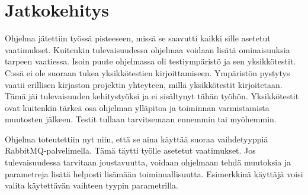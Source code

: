 \section{Jatkokehitys}
Ohjelma jätettiin työssä pisteeseen, missä se saavutti kaikki sille asetetut vaatimukset. Kuitenkin tulevaisuudessa ohjelmaa voidaan lisätä ominaisuuksia tarpeen vaatiessa. Isoin puute ohjelmassa oli testiympäristö ja sen yksikkötestit. C:ssä ei ole suoraan tukea yksikkötestien kirjoittamiseen. Ympäristön pystytys vaatii erillisen kirjaston projektin yhteyteen, millä yksikkötestit kirjoitetaan. Tämä jäi tulevaisuuden kehitystyöksi ja ei sisältynyt tähän työhön. Yksikkötestit ovat kuitenkin tärkeä osa ohjelman ylläpitoa ja toiminnan varmistamista muutosten jälkeen. Testit tullaan tarvitsemaan ennemmin tai myöhemmin.

Ohjelma toteutettiin nyt niin, että se aina käyttää suoraa vaihdetyyppiä RabbitMQ-pal\-ve\-li\-mel\-la. Tämä täytti työlle asetetut vaatimukset. Jos tulevaisuudessa tarvitaan joustavuutta, voidaan ohjelmaan tehdä muutoksia ja parametreja lisätä helposti lisämään toiminnallisuutta. Esimerkkinä käyttäjä voisi valita käytettävän vaihteen tyypin parametrilla.
